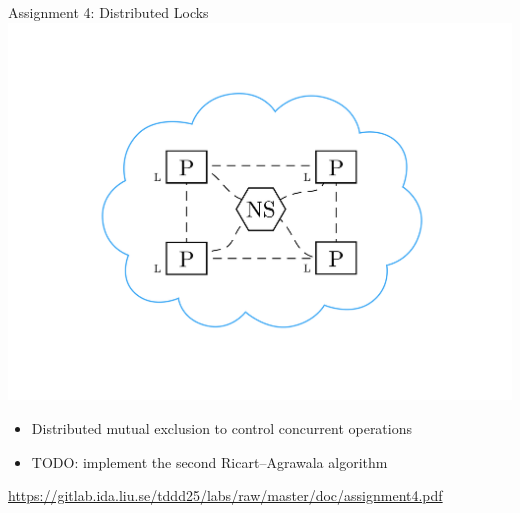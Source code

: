 \documentclass[compress,xcolor=table]{beamer}
\begin{document}
\begin{frame}{Assignment 4: Distributed Locks}
  \centering
  \includegraphics[scale=0.10,page=1]{include/assets/lock}
  \begin{itemize}
    \item Distributed mutual exclusion to control concurrent operations
    \item \alert{TODO}: implement the second Ricart--Agrawala algorithm
  \end{itemize}
  \begin{center}
    \scriptsize \url{https://gitlab.ida.liu.se/tddd25/labs/raw/master/doc/assignment4.pdf}
  \end{center}
\end{frame}
\end{document}
